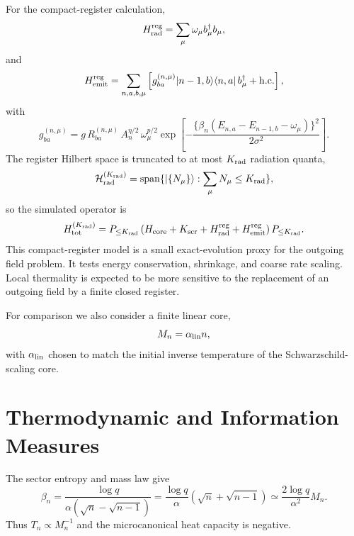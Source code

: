 \documentclass[12pt]{article}
\newcommand{\Hrad}{\mathcal H_{\rm rad}}
\newcommand{\ket}[1]{|#1\rangle}
\newcommand{\bra}[1]{\langle #1|}
\begin{document}
For the compact-register calculation,
\begin{equation}
    H_{\rm rad}^{\rm reg}=\sum_\mu \omega_\mu b_\mu^\dagger b_\mu ,
\end{equation}
and
\begin{equation}
    H_{\rm emit}^{\rm reg}
    =
    \sum_{n,a,b,\mu}
    \left[
    g^{(n,\mu)}_{ba}
    \ket{n-1,b}\bra{n,a}\,b_\mu^\dagger
    +{\rm h.c.}
    \right],
\end{equation}
with
\begin{equation}
    g^{(n,\mu)}_{ba}
    =
    g\,R^{(n,\mu)}_{ba}\,
    A_n^{\eta/2}\,
    \omega_\mu^{p/2}
    \exp\left[
    -\frac{\{\beta_n(E_{n,a}-E_{n-1,b}-\omega_\mu)\}^2}{2\sigma^2}
    \right].
\end{equation}
The register Hilbert space is truncated to at most $K_{\rm rad}$ radiation
quanta,
\begin{equation}
    \Hrad^{(K_{\rm rad})}
    =
    {\rm span}\{\ket{\{N_\mu\}}:\sum_\mu N_\mu\le K_{\rm rad}\},
\end{equation}
so the simulated operator is
\begin{equation}
    H_{\rm tot}^{(K_{\rm rad})}
    =
    P_{\le K_{\rm rad}}
    \left(H_{\rm core}+K_{\rm scr}+H_{\rm rad}^{\rm reg}
    +H_{\rm emit}^{\rm reg}\right)
    P_{\le K_{\rm rad}} .
\end{equation}
This compact-register model is a small exact-evolution proxy for the outgoing
field problem.  It tests energy conservation, shrinkage, and coarse rate
scaling.  Local thermality is expected to be more sensitive to the replacement
of an outgoing field by a finite closed register.

For comparison we also consider a finite linear core,
\begin{equation}
    M_n=\alpha_{\rm lin}n ,
\end{equation}
with $\alpha_{\rm lin}$ chosen to match the initial inverse temperature of the
Schwarzschild-scaling core.

\section{Thermodynamic and Information Measures}

The sector entropy and mass law give
\begin{equation}
    \beta_n
    =
    \frac{\log q}{\alpha(\sqrt n-\sqrt{n-1})}
    =
    \frac{\log q}{\alpha}(\sqrt n+\sqrt{n-1})
    \simeq \frac{2\log q}{\alpha^2}M_n .
\end{equation}
Thus $T_n\propto M_n^{-1}$ and the microcanonical heat capacity is negative.
\end{document}
